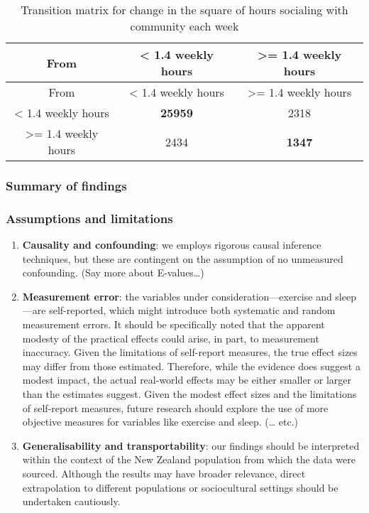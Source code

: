 \documentclass[
  singlecolumn]{article}
\begin{document}
\begin{longtable}[]{@{}ccc@{}}
\caption{Transition matrix for change in the square of hours socialing
with community each
week}\label{tbl-transition-socialising-shift}\tabularnewline
\toprule\noalign{}
From & \textless{} 1.4 weekly hours & \textgreater= 1.4 weekly hours \\
\midrule\noalign{}
\endfirsthead
\toprule\noalign{}
From & \textless{} 1.4 weekly hours & \textgreater= 1.4 weekly hours \\
\midrule\noalign{}
\endhead
\bottomrule\noalign{}
\endlastfoot
\textless{} 1.4 weekly hours & \textbf{25959} & 2318 \\
\textgreater= 1.4 weekly hours & 2434 & \textbf{1347} \\
\end{longtable}

\subsubsection{Summary of findings}\label{summary-of-findings}

\subsubsection{Assumptions and
limitations}\label{assumptions-and-limitations}

\begin{enumerate}
\def\labelenumi{\arabic{enumi}.}
\item
  \textbf{Causality and confounding}: we employs rigorous causal
  inference techniques, but these are contingent on the assumption of no
  unmeasured confounding. (Say more about E-values\ldots)
\item
  \textbf{Measurement error}: the variables under
  consideration---exercise and sleep---are self-reported, which might
  introduce both systematic and random measurement errors. It should be
  specifically noted that the apparent modesty of the practical effects
  could arise, in part, to measurement inaccuracy. Given the limitations
  of self-report measures, the true effect sizes may differ from those
  estimated. Therefore, while the evidence does suggest a modest impact,
  the actual real-world effects may be either smaller or larger than the
  estimates suggest. Given the modest effect sizes and the limitations
  of self-report measures, future research should explore the use of
  more objective measures for variables like exercise and sleep.
  (\ldots{} etc.)
\item
  \textbf{Generalisability and transportability}: our findings should be
  interpreted within the context of the New Zealand population from
  which the data were sourced. Although the results may have broader
  relevance, direct extrapolation to different populations or
  sociocultural settings should be undertaken cautiously.
\end{enumerate}
\end{document}
